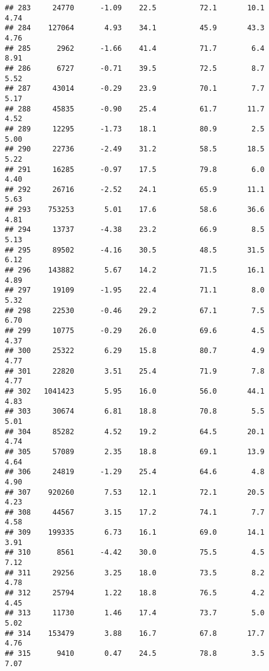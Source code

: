 \documentclass[
]{article}
\begin{document}
\begin{verbatim}
## 283     24770      -1.09    22.5          72.1       10.1              4.74
## 284    127064       4.93    34.1          45.9       43.3              4.76
## 285      2962      -1.66    41.4          71.7        6.4              8.91
## 286      6727      -0.71    39.5          72.5        8.7              5.52
## 287     43014      -0.29    23.9          70.1        7.7              5.17
## 288     45835      -0.90    25.4          61.7       11.7              4.52
## 289     12295      -1.73    18.1          80.9        2.5              5.00
## 290     22736      -2.49    31.2          58.5       18.5              5.22
## 291     16285      -0.97    17.5          79.8        6.0              4.40
## 292     26716      -2.52    24.1          65.9       11.1              5.63
## 293    753253       5.01    17.6          58.6       36.6              4.81
## 294     13737      -4.38    23.2          66.9        8.5              5.13
## 295     89502      -4.16    30.5          48.5       31.5              6.12
## 296    143882       5.67    14.2          71.5       16.1              4.89
## 297     19109      -1.95    22.4          71.1        8.0              5.32
## 298     22530      -0.46    29.2          67.1        7.5              6.70
## 299     10775      -0.29    26.0          69.6        4.5              4.37
## 300     25322       6.29    15.8          80.7        4.9              4.77
## 301     22820       3.51    25.4          71.9        7.8              4.77
## 302   1041423       5.95    16.0          56.0       44.1              4.83
## 303     30674       6.81    18.8          70.8        5.5              5.01
## 304     85282       4.52    19.2          64.5       20.1              4.74
## 305     57089       2.35    18.8          69.1       13.9              4.64
## 306     24819      -1.29    25.4          64.6        4.8              4.90
## 307    920260       7.53    12.1          72.1       20.5              4.23
## 308     44567       3.15    17.2          74.1        7.7              4.58
## 309    199335       6.73    16.1          69.0       14.1              3.91
## 310      8561      -4.42    30.0          75.5        4.5              7.12
## 311     29256       3.25    18.0          73.5        8.2              4.78
## 312     25794       1.22    18.8          76.5        4.2              4.45
## 313     11730       1.46    17.4          73.7        5.0              5.02
## 314    153479       3.88    16.7          67.8       17.7              4.76
## 315      9410       0.47    24.5          78.8        3.5              7.07

\end{verbatim}
\end{document}
